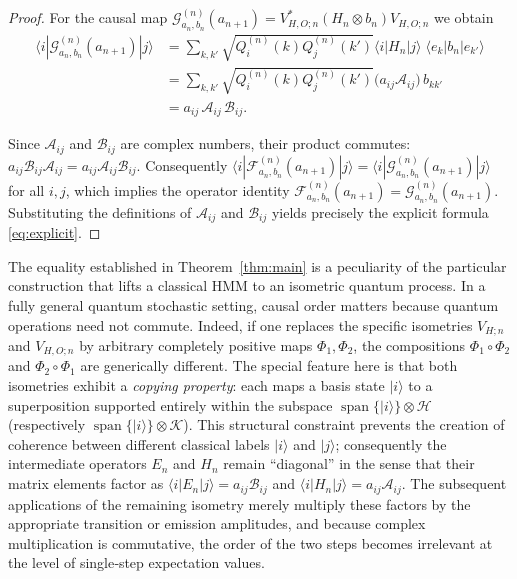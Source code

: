 \documentclass[11pt, reco]{article}
\begin{document}
\begin{proof}
For the causal map $\mathcal{G}_{a_n,b_n}^{(n)}(a_{n+1})=V_{H,O;n}^{*}(H_n\otimes b_n)V_{H,O;n}$ we obtain
\begin{align*}
\langle i|\mathcal{G}_{a_n,b_n}^{(n)}(a_{n+1})|j\rangle
&=\sum_{k,k'}\sqrt{Q^{(n)}_i(k)Q^{(n)}_j(k')}
\langle i|H_n|j\rangle\;\langle e_k|b_n|e_{k'}\rangle \\
&=\sum_{k,k'}\sqrt{Q^{(n)}_i(k)Q^{(n)}_j(k')}
\bigl(a_{ij}\mathcal{A}_{ij}\bigr)\,b_{kk'} \\
&=a_{ij}\,\mathcal{A}_{ij}\,\mathcal{B}_{ij}.
\end{align*}

Since $\mathcal{A}_{ij}$ and $\mathcal{B}_{ij}$ are complex numbers, their product commutes:
$a_{ij}\mathcal{B}_{ij}\mathcal{A}_{ij}=a_{ij}\mathcal{A}_{ij}\mathcal{B}_{ij}$.
Consequently $\langle i|\mathcal{F}_{a_n,b_n}^{(n)}(a_{n+1})|j\rangle
=\langle i|\mathcal{G}_{a_n,b_n}^{(n)}(a_{n+1})|j\rangle$ for all $i,j$, which implies the operator identity $\mathcal{F}_{a_n,b_n}^{(n)}(a_{n+1})=\mathcal{G}_{a_n,b_n}^{(n)}(a_{n+1})$.
Substituting the definitions of $\mathcal{A}_{ij}$ and $\mathcal{B}_{ij}$ yields precisely the explicit formula \eqref{eq:explicit}.
\end{proof}

The equality established in Theorem~\ref{thm:main} is a peculiarity of the particular construction that lifts a classical HMM to an isometric quantum process.
In a fully general quantum stochastic setting, causal order matters because quantum operations need not commute.
Indeed, if one replaces the specific isometries $V_{H;n}$ and $V_{H,O;n}$ by arbitrary completely positive maps $\Phi_1,\Phi_2$, the compositions $\Phi_1\circ\Phi_2$ and $\Phi_2\circ\Phi_1$ are generically different.
The special feature here is that both isometries exhibit a \emph{copying property}: each maps a basis state $|i\rangle$ to a superposition supported entirely within the subspace $\operatorname{span}\{|i\rangle\}\otimes\mathcal{H}$ (respectively $\operatorname{span}\{|i\rangle\}\otimes\mathcal{K}$).
This structural constraint prevents the creation of coherence between different classical labels $|i\rangle$ and $|j\rangle$; consequently the intermediate operators $E_n$ and $H_n$ remain ``diagonal'' in the sense that their matrix elements factor as $\langle i|E_n|j\rangle = a_{ij}\mathcal{B}_{ij}$ and $\langle i|H_n|j\rangle = a_{ij}\mathcal{A}_{ij}$.
The subsequent applications of the remaining isometry merely multiply these factors by the appropriate transition or emission amplitudes, and because complex multiplication is commutative, the order of the two steps becomes irrelevant at the level of single‑step expectation values.
\end{document}
